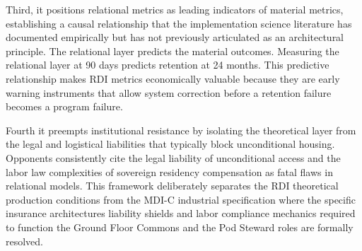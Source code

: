 \documentclass[12pt, letterpaper]{article}
\begin{document}
Third, it positions relational metrics as leading indicators of material metrics, establishing a causal relationship that the implementation science literature has documented empirically but has not previously articulated as an architectural principle. The relational layer predicts the material outcomes. Measuring the relational layer at 90 days predicts retention at 24 months. This predictive relationship makes RDI metrics economically valuable because they are early warning instruments that allow system correction before a retention failure becomes a program failure.

Fourth it preempts institutional resistance by isolating the theoretical layer from the legal and logistical liabilities that typically block unconditional housing. Opponents consistently cite the legal liability of unconditional access and the labor law complexities of sovereign residency compensation as fatal flaws in relational models. This framework deliberately separates the RDI theoretical production conditions from the MDI-C industrial specification where the specific insurance architectures liability shields and labor compliance mechanics required to function the Ground Floor Commons and the Pod Steward roles are formally resolved.

\newpage
{}


\end{document}
